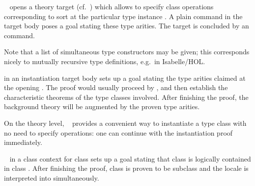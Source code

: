 \begin{isabellebody}
\begin{isamarkuptext}
\begin{description}
  \item \hyperlink{command.instantiation}{\mbox{}}~ opens a theory target (cf.\ ) which
  allows to specify class operations  corresponding
  to sort  at the particular type instance .  A plain \hyperlink{command.instance}{\mbox{}} command in the
  target body poses a goal stating these type arities.  The target is
  concluded by an \hyperlink{command.local.end}{\mbox{}} command.

  Note that a list of simultaneous type constructors may be given;
  this corresponds nicely to mutually recursive type definitions, e.g.\
  in Isabelle/HOL.

  \item \hyperlink{command.instance}{\mbox{}} in an instantiation target body sets
  up a goal stating the type arities claimed at the opening \hyperlink{command.instantiation}{\mbox{}}.  The proof would usually proceed by \hyperlink{method.intro-classes}{\mbox{}}, and then establish the characteristic theorems of
  the type classes involved.  After finishing the proof, the
  background theory will be augmented by the proven type arities.

  On the theory level, \hyperlink{command.instance}{\mbox{}}~ provides a convenient way to instantiate a type class with no
  need to specify operations: one can continue with the
  instantiation proof immediately.

  \item \hyperlink{command.subclass}{\mbox{}}~ in a class context for class
   sets up a goal stating that class  is logically
  contained in class .  After finishing the proof, class
  \isa{d} is proven to be subclass  and the locale \isa{c} is interpreted into  simultaneously.


\end{description}
\end{isamarkuptext}
\end{isabellebody}
